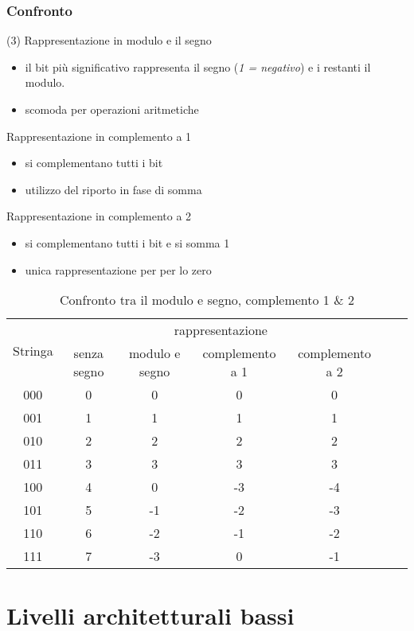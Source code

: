 \documentclass{book}
\begin{document}
\subsection{Confronto}
\begin{tasks}(3)
	\task Rappresentazione in modulo e il segno
	\begin{itemize}
		\item il bit più significativo rappresenta il segno (\textit{1 =
			negativo}) e i restanti il modulo.
		\item scomoda per operazioni aritmetiche
	\end{itemize}
	\task Rappresentazione in complemento a 1
	\begin{itemize}
		\item si complementano tutti i bit
		\item utilizzo del riporto in fase di somma
	\end{itemize}
	\task Rappresentazione in complemento a 2
	\begin{itemize}
		\item si complementano tutti i bit e si somma 1
		\item unica rappresentazione per per lo zero
	\end{itemize}
\end{tasks}
\begin{table}[h!]
	\centering
	\begin{tabular}{|c|c|c|c|c|c|c|}
		\hline
		\multirow{2}{*}{Stringa}&\multicolumn{4}{c|}{rappresentazione}\\
		&senza segno&modulo e segno&complemento a 1&complemento a 2\\\hline
		000&0&0&0&0\\\hline
		001&1&1&1&1\\\hline
		010&2&2&2&2\\\hline
		011&3&3&3&3\\\hline
		100&4&0&-3&-4\\\hline
		101&5&-1&-2&-3\\\hline
		110&6&-2&-1&-2\\\hline
		111&7&-3&0&-1\\\hline
	\end{tabular}
	\caption {Confronto tra il modulo e segno, complemento 1 \& 2}
\end{table}



\chapter{Livelli architetturali bassi}
\end{document}
